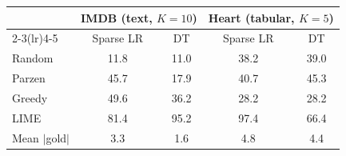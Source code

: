 \begin{tabular}{lcccc}
\toprule
 & \multicolumn{2}{c}{IMDB (text, $K{=}10$)} & \multicolumn{2}{c}{Heart (tabular, $K{=}5$)} \\
\cmidrule(lr){2-3}\cmidrule(lr){4-5}
 & Sparse LR & DT & Sparse LR & DT \\
\midrule
Random & 11.8 & 11.0 & 38.2 & 39.0 \\
Parzen & 45.7 & 17.9 & 40.7 & 45.3 \\
Greedy & 49.6 & 36.2 & 28.2 & 28.2 \\
LIME & 81.4 & 95.2 & 97.4 & 66.4 \\
\midrule
Mean $|$gold$|$ & 3.3 & 1.6 & 4.8 & 4.4 \\
\bottomrule
\end{tabular}
